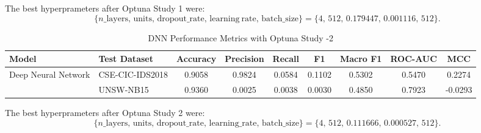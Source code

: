 The best hyperprameters after Optuna Study 1 were:
\[
\{n\_{\mathrm{layers}},\, \mathrm{units},\, \mathrm{dropout\_rate},\, 
\mathrm{learning\ rate},\, \mathrm{batch\_size}\}
=
\{4,\,512,\,0.179447,\,0.001116,\,512\}.
\]

\begin{table}[htbp]
    \centering
    \caption{DNN Performance Metrics with Optuna Study -2}
    \label{tab:DNN_performance_metrics_optuna2}
    \scriptsize
    \setlength{\tabcolsep}{3pt}

    \begin{tabular}{llccccccc}
        \toprule
        \textbf{Model} & \textbf{Test Dataset} &
        \textbf{Accuracy} & \textbf{Precision} & \textbf{Recall} &
        \textbf{F1} & \textbf{Macro F1} & \textbf{ROC-AUC} & \textbf{MCC} \\
        \midrule

        \multirow[c]{2}{*}{Deep Neural Network}
        & CSE-CIC-IDS2018 & 0.9058 & 0.9824 & 0.0584 & 0.1102 & 0.5302 & 0.5470 & 0.2274 \\
        & UNSW-NB15       & 0.9360 & 0.0025 & 0.0038 & 0.0030 & 0.4850 & 0.7923 & -0.0293 \\
        \bottomrule
    \end{tabular}
\end{table}

The best hyperprameters after Optuna Study 2 were: 
\[
\{n\_{\mathrm{layers}},\, \mathrm{units},\, \mathrm{dropout\_rate},\,
\mathrm{learning\_rate},\, \mathrm{batch\_size}\}
=
\{4,\,512,\,0.111666,\,0.000527,\,512\}.
\]

